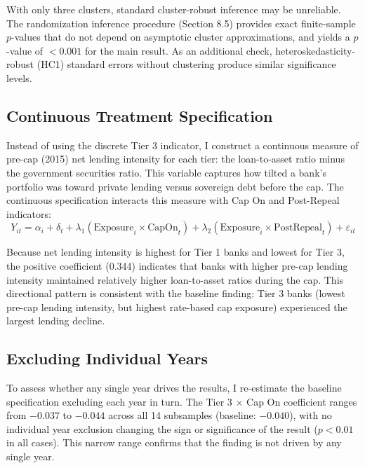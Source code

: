 \documentclass[12pt]{article}
\begin{document}
With only three clusters, standard cluster-robust inference may be unreliable. The randomization inference procedure (Section 8.5) provides exact finite-sample $p$-values that do not depend on asymptotic cluster approximations, and yields a $p$-value of $<0.001$ for the main result. As an additional check, heteroskedasticity-robust (HC1) standard errors without clustering produce similar significance levels.

\subsection{Continuous Treatment Specification}

Instead of using the discrete Tier 3 indicator, I construct a continuous measure of pre-cap (2015) net lending intensity for each tier: the loan-to-asset ratio minus the government securities ratio. This variable captures how tilted a bank's portfolio was toward private lending versus sovereign debt before the cap. The continuous specification interacts this measure with Cap On and Post-Repeal indicators:
\begin{equation}
    Y_{it} = \alpha_i + \delta_t + \lambda_1 (\text{Exposure}_i \times \text{CapOn}_t) + \lambda_2 (\text{Exposure}_i \times \text{PostRepeal}_t) + \varepsilon_{it}
\end{equation}

Because net lending intensity is highest for Tier 1 banks and lowest for Tier 3, the positive coefficient (0.344) indicates that banks with higher pre-cap lending intensity maintained relatively higher loan-to-asset ratios during the cap. This directional pattern is consistent with the baseline finding: Tier 3 banks (lowest pre-cap lending intensity, but highest rate-based cap exposure) experienced the largest lending decline.

\subsection{Excluding Individual Years}

To assess whether any single year drives the results, I re-estimate the baseline specification excluding each year in turn. The Tier 3 $\times$ Cap On coefficient ranges from $-0.037$ to $-0.044$ across all 14 subsamples (baseline: $-0.040$), with no individual year exclusion changing the sign or significance of the result ($p < 0.01$ in all cases). This narrow range confirms that the finding is not driven by any single year.
\end{document}
